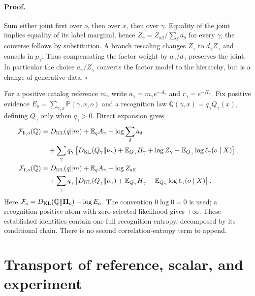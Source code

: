 \paragraph{Proof.}
Sum either joint first over $o$, then over $x$, then over $\gamma$.
Equality of the joint implies equality of its label marginal, hence
$Z_\gamma=Z_{\mathrm{all}}/\sum_\delta a_\delta$ for every $\gamma$;
the converse follows by substitution. A branch rescaling changes
$Z_\gamma$ to $d_\gamma Z_\gamma$ and cancels in $p_\gamma$.
Thus compensating the factor weight by $a_\gamma/d_\gamma$ preserves the
joint. In particular the choice $a_\gamma/Z_\gamma$ converts the factor
model to the hierarchy, but is a change of generative data.
$\square$

For a positive catalog reference $m_\gamma$ write
$a_\gamma=m_\gamma e^{-A_\gamma}$ and $r_\gamma=e^{-H_\gamma}$.
Fix positive evidence $E_o=\sum_{\gamma,x}\mathbb P(\gamma,x,o)$ and a
recognition law $\mathbb Q(\gamma,x)=q_\gamma Q_\gamma(x)$, defining
$Q_\gamma$ only when $q_\gamma>0$. Direct expansion gives
\begin{align}
 \mathcal F_{\mathrm h,o}(\mathbb Q)
 &=D_{\mathrm{KL}}(q\Vert m)+\mathbb E_q A_\gamma+\log\sum_\delta a_\delta
 \nonumber\\
 &\quad+\sum_\gamma q_\gamma
 \left[D_{\mathrm{KL}}(Q_\gamma\Vert\nu_\gamma)+\mathbb E_{Q_\gamma}H_\gamma
       +\log Z_\gamma-\mathbb E_{Q_\gamma}\log\ell_\gamma(o\mid X)\right],
 \label{eq:rg-geometry-vfe-h}\\
 \mathcal F_{\mathrm f,o}(\mathbb Q)
 &=D_{\mathrm{KL}}(q\Vert m)+\mathbb E_q A_\gamma+\log Z_{\mathrm{all}}
 \nonumber\\
 &\quad+\sum_\gamma q_\gamma
 \left[D_{\mathrm{KL}}(Q_\gamma\Vert\nu_\gamma)+\mathbb E_{Q_\gamma}H_\gamma
       -\mathbb E_{Q_\gamma}\log\ell_\gamma(o\mid X)\right].
 \label{eq:rg-geometry-vfe-f}
\end{align}
Here $\mathcal F_o=D_{\mathrm{KL}}(\mathbb Q\Vert\boldsymbol\Pi_o)-\log E_o$.
The convention $0\log0=0$ is used; a recognition-positive atom with zero
selected likelihood gives $+\infty$. These established identities contain
one full recognition entropy, decomposed by its conditional chain. There is
no second correlation-entropy term to append. 

\section{Transport of reference, scalar, and experiment}
\label{sec:rg-geometry-transport}

